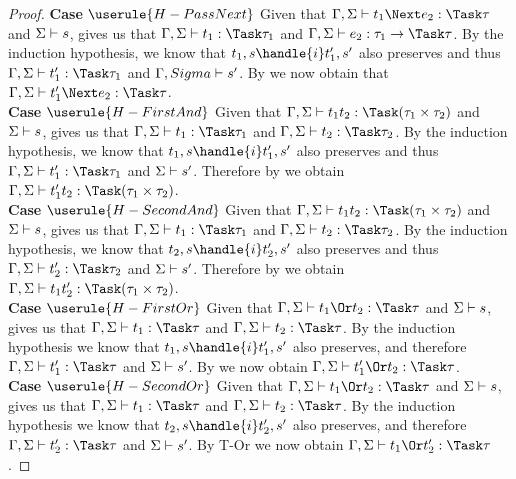 \begin{proof}
  \noindent\textbf{Case} $\userule{H-PassNext}$ Given that
  $\Gamma,\Sigma\infers t_1\Next e_2:\Task\tau$ and $\Sigma\vdash s$,
   gives us that $\Gamma,\Sigma\infers t_1:\Task\tau_1$ and
  $\Gamma,\Sigma\infers e_2:\tau_1\to\Task\tau$. By the induction hypothesis, we
  know that $t_1,s\handle{i}t_1',s'$ also preserves and thus
  $\Gamma,\Sigma\infers t_1':\Task\tau_1$ and $\Gamma,Sigma\vdash s'$. By
   we now obtain that
  $\Gamma,\Sigma\infers t_1'\Next e_2:\Task\tau$. \\

  \noindent\textbf{Case} $\userule{H-FirstAnd}$ Given that
  $\Gamma,\Sigma\infers t_1\And t_2:\Task(\tau_1\times\tau_2)$ and
  $\Sigma\vdash s$,  gives us that
  $\Gamma,\Sigma\infers t_1:\Task\tau_1$ and
  $\Gamma,\Sigma\infers t_2:\Task\tau_2$. By the induction hypothesis, we know
  that $t_1,s\handle{i}t_1',s'$ also preserves and thus
  $\Gamma,\Sigma\infers t_1':\Task\tau_1$ and $\Sigma\vdash s'$. Therefore by
   we obtain
  $\Gamma,\Sigma\infers t_1'\And t_2:\Task(\tau_1\times\tau_2)$.\\

  \noindent\textbf{Case} $\userule{H-SecondAnd}$ Given that
  $\Gamma,\Sigma\infers t_1\And t_2:\Task(\tau_1\times\tau_2)$ and
  $\Sigma\vdash s$,  gives us that
  $\Gamma,\Sigma\infers t_1:\Task\tau_1$ and
  $\Gamma,\Sigma\infers t_2:\Task\tau_2$. By the induction hypothesis, we know
  that $t_2,s\handle{i}t_2',s'$ also preserves and thus
  $\Gamma,\Sigma\infers t_2':\Task\tau_2$ and $\Sigma\vdash s'$. Therefore by
   we obtain
  $\Gamma,\Sigma\infers t_1\And t_2':\Task(\tau_1\times\tau_2)$.\\

  \noindent\textbf{Case} $\userule{H-FirstOr}$ Given that
  $\Gamma,\Sigma\infers t_1\Or t_2:\Task\tau$ and $\Sigma\vdash s$,
   gives us that $\Gamma,\Sigma\infers t_1:\Task\tau$ and
  $\Gamma,\Sigma\infers t_2:\Task\tau$. By the induction hypothesis we know that
  $t_1,s\handle{i}t_1',s'$ also preserves, and therefore
  $\Gamma,\Sigma\infers t_1':\Task\tau$ and $\Sigma\vdash s'$. By
   we now obtain $\Gamma,\Sigma\infers t_1'\Or t_2:\Task\tau$.\\

  \noindent\textbf{Case} $\userule{H-SecondOr}$ Given that
  $\Gamma,\Sigma\infers t_1\Or t_2:\Task\tau$ and $\Sigma\vdash s$,
   gives us that $\Gamma,\Sigma\infers t_1:\Task\tau$ and
  $\Gamma,\Sigma\infers t_2:\Task\tau$. By the induction hypothesis we know that
  $t_2,s\handle{i}t_2',s'$ also preserves, and therefore
  $\Gamma,\Sigma\infers t_2':\Task\tau$ and $\Sigma\vdash s'$. By T-Or we now
  obtain $\Gamma,\Sigma\infers t_1\Or t_2':\Task\tau$.

\end{proof}

